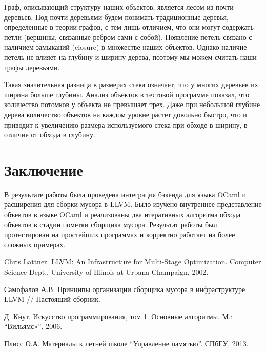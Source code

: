 Граф, описывающий структуру наших объектов, является лесом из почти деревьев. Под почти деревьями будем понимать традиционные деревья, определенные в теории графов, 
с тем лишь 
отличием, что они могут содержать петли (вершины, связанные ребром сами с собой). Появление петель связано с наличием замыканий (closure) в множестве наших 
объектов. Однако наличие петель не влияет на глубину и ширину дерева, поэтому мы можем считать наши графы деревьями.

Такая значительная разница в размерах стека означает, что у многих деревьев их ширина больше глубины. Анализ объектов в тестовой программе показал, что 
количество потомков у объекта не превышает трех. Даже при небольшой глубине дерева количество объектов на каждом уровне растет довольно быстро, что и приводит 
к увеличению размера используемого стека при обходе в ширину, в отличие от обхода в глубину.

\section*{Заключение}

В результате работы была проведена интеграция бэкенда для языка OCaml и расширения для сборки мусора в LLVM. Было изучено внутреннее 
представление объектов в языке OCaml и реализованы два итеративных алгоритма обхода объектов в стадии пометки сборщика мусора. Результат работы был протестирован
на простейших программах и корректно работает на более сложных примерах. 

\begin{thebibliography}{99}
 Chris Lattner.
LLVM: An Infrastructure for Multi-Stage Optimization.
Computer Science Dept., University of Illinois at Urbana-Champaign, 2002.

Самофалов А.В. Принципы организации сборщика мусора в инфраструктуре LLVM // 
Настоящий сборник.

Д. Кнут. Искусство программирования, том 1. Основные алгоритмы.
М.: ``Вильямс»'', 2006.

Плисс О.А. Материалы к летней школе ``Управление памятью''. СПбГУ, 2013.

\end{thebibliography}
